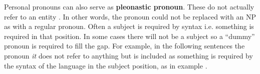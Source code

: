 \documentclass[a4paper]{article}
\begin{document}
% 
% 
% 
% 
% 
% 

Personal pronouns can also serve as {\bf pleonastic pronoun}. These do not actually refer to an entity \cite[p. 5]{GuillouEtAlGuide}. In other words, the
pronoun could not be replaced with an NP as with a regular pronoun. Often a subject is required by syntax i.e. something is required in that position. In some cases there will not be a subject so a ``dummy'' pronoun is required to fill
the gap. For example, in the following sentences the pronoun {\sl it} does not refer to anything but is included as something is required by the syntax of the language in the subject position, as in example \Next.
\end{document}
